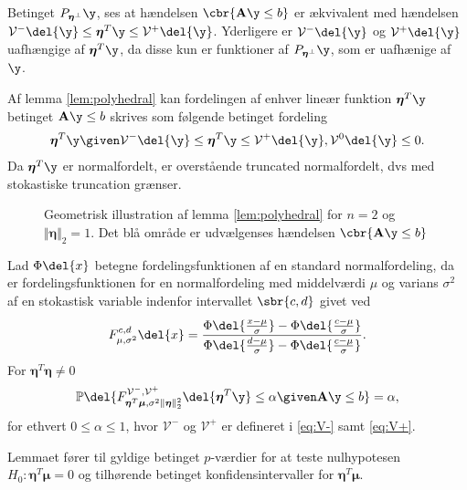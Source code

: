 Betinget \(P_{\boldsymbol{\eta}^\perp} \y\), ses at hændelsen \(\cbr{\mathbf{A} \y \leq b}\) er ækvivalent med hændelsen \(\mathcal{V}^- \del{\y} \leq \boldsymbol{\eta}^T \y \leq \mathcal{V}^+ \del{\y}\). Yderligere er \(\mathcal{V}^- \del{\y}\) og \(\mathcal{V}^+ \del{\y}\) uafhængige af \(\boldsymbol{\eta}^T \y\), da disse kun er funktioner af \(P_{\boldsymbol{\eta}^\perp} \y\), som er uafhænige af \(\y\).


Af lemma \ref{lem:polyhedral} kan fordelingen af enhver lineær funktion \(\boldsymbol{\eta}^T \y\) betinget \(\mathbf{A} \y \leq b\) skrives som følgende betinget fordeling
\begin{align*}
\boldsymbol{\eta}^T \y \given \mathcal{V}^- \del{\y} \leq \boldsymbol{\eta}^T \y \leq \mathcal{V}^+ \del{\y}, \mathcal{V}^0 \del{\y} \leq 0.
\end{align*}
Da \(\boldsymbol{\eta}^T \y\) er normalfordelt, er overstående truncated normalfordelt, dvs med stokastiske truncation grænser.

\begin{figure}[H]
\centering
\scalebox{1}{}
\caption{Geometrisk illustration af lemma \ref{lem:polyhedral} for \(n=2\) og \(\Vert \boldsymbol{\eta} \Vert_2=1\). 
Det blå område er udvælgenses hændelsen \(\cbr{\mathbf{A} \y \leq b}\)}
\end{figure}


\begin{lem}  \label{lem:lem2}
Lad \(\Phi \del{x}\) betegne fordelingsfunktionen af en standard normalfordeling, da er fordelingsfunktionen for en normalfordeling med middelværdi \(\mu\) og varians \(\sigma^2\) af en stokastisk variable indenfor intervallet \(\sbr{c,d}\) givet ved
\begin{align*}
F_{\mu, \sigma^2}^{c,d} \del{x} = \frac{\Phi\del{\frac{x-\mu}{\sigma}} - \Phi\del{\frac{c-\mu}{\sigma}}}{\Phi\del{\frac{d-\mu}{\sigma}} - \Phi\del{\frac{c-\mu}{\sigma}}}.
\end{align*}
For \(\boldsymbol{\eta}^T \boldsymbol{\eta} \neq 0\)
\begin{align*}
\mathbb{P} \del{F_{\boldsymbol{\eta}^T \boldsymbol{\mu}, \sigma^2 \Vert \boldsymbol{\eta} \Vert_2^2}^{\mathcal{V}^-, \mathcal{V}^+} \del{\boldsymbol{\eta}^T \y} \leq \alpha \given \mathbf{A} \y \leq b} = \alpha, 
\end{align*}
for ethvert \(0 \leq \alpha \leq 1\), hvor \(\mathcal{V}^-\) og \(\mathcal{V}^+\) er defineret i \eqref{eq:V-} samt \eqref{eq:V+}. 
\end{lem}
%
Lemmaet fører til gyldige betinget \(p\)-værdier for at teste nulhypotesen \(H_0: \boldsymbol{\eta}^T \boldsymbol{\mu}=0\) og tilhørende betinget konfidensintervaller for \(\boldsymbol{\eta}^T \boldsymbol{\mu}\).

